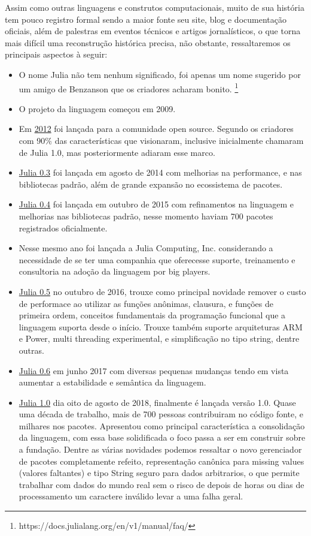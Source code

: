 Assim como outras linguagens e construtos computacionais, muito de sua história tem pouco registro formal sendo a maior fonte seu site, blog e documentação oficiais, além de palestras em eventos técnicos e artigos jornalísticos, o que torna mais difícil uma reconstrução histórica precisa, não obstante, ressaltaremos os principais aspectos à seguir: 
\begin{itemize}
   \item O nome Julia não tem nenhum significado, foi apenas um nome sugerido por um amigo de Benzanson que os criadores acharam bonito. \footnote{https://docs.julialang.org/en/v1/manual/faq/}
   \item O projeto da linguagem começou em 2009.
   \item Em \href{https://julialang.org/blog/2012/02/why-we-created-julia/}{2012} foi lançada para a comunidade open source. Segundo os criadores com 90\% das características que visionaram, inclusive inicialmente chamaram de Julia 1.0, mas posteriormente adiaram esse marco. 
   \item \href{https://julialang.org/blog/2014/08/julia-0.3-release/}{Julia 0.3} foi lançada em agosto de 2014 com melhorias na performance, e nas bibliotecas padrão, além de grande expansão no ecossistema de pacotes. 
   \item \href{https://julialang.org/blog/2015/10/julia-0.4-release/}{Julia 0.4} foi lançada em outubro de 2015 com refinamentos na linguagem e melhorias nas bibliotecas padrão, nesse momento haviam 700 pacotes registrados oficialmente.
   \item Nesse mesmo ano foi lançada a Julia Computing, Inc. considerando a necessidade de se ter uma companhia que oferecesse suporte, treinamento e consultoria na adoção da linguagem por big players. 
   \item \href{https://julialang.org/blog/2016/10/julia-0.5-release/}{Julia 0.5} no outubro de 2016, trouxe como principal novidade remover o custo de performace ao utilizar as funções anônimas, clausura, e funções de primeira ordem, conceitos fundamentais da programação funcional que a linguagem suporta desde o início. Trouxe também suporte arquiteturas ARM e Power, multi threading experimental, e simplificação no tipo string, dentre outras. 
   \item \href{https://julialang.org/blog/2017/06/julia-0.6-release/}{Julia 0.6} em junho 2017 com diversas pequenas mudanças tendo em vista aumentar a estabilidade e semântica da linguagem. 
   \item \href{https://julialang.org/blog/2018/08/one-point-zero/}{Julia 1.0}  dia oito de agosto de 2018, finalmente é lançada versão 1.0. Quase uma década de trabalho, mais de 700 pessoas contribuiram no código fonte, e milhares nos pacotes. Apresentou como principal característica a consolidação da linguagem, com essa base solidificada o foco passa a ser em construir sobre a fundação. Dentre as várias novidades podemos ressaltar o novo gerenciador de pacotes completamente refeito, representação canônica para missing values (valores faltantes) e tipo String seguro para dados arbitrarios, o que permite trabalhar com dados do mundo real sem o risco de depois de horas ou dias de processamento um caractere inválido levar a uma falha geral. 

\end{itemize}
